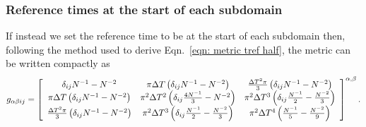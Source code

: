 \documentclass[../full_thesis/full_thesis.tex]{subfiles}
\begin{document}
\subsubsection{Reference times at the start of each subdomain}
If instead we set the reference time to be at the start of each subdomain then,
following the method used to derive Eqn.~\eqref{eqn: metric tref half}, the
metric can be written compactly as
\begin{equation}
g_{\alpha\beta ij}  =  \left[\begin{array}{ccc}
\delta_{ij}N^{-1}  -N^{-2}  &
\pi\Delta T \left( \delta_{ij}N^{-1} - N^{-2}\right)&
\frac{\Delta T^{2}\pi}{3} \left( \delta_{ij}N^{-1} - N^{-2}\right)\\
\pi\Delta T \left( \delta_{ij}N^{-1} - N^{-2}\right)&
\pi^{2}\Delta T^{2}\left(\delta_{ij}\frac{4N^{-1}}{3} - N^{-2}\right) &
\pi^{2}\Delta T^{3}\left(\delta_{ij}\frac{N^{-1}}{2} - \frac{N^{-2}}{3}\right) \\
\frac{\Delta T^{2}\pi}{3} \left( \delta_{ij}N^{-1} - N^{-2}\right) &
\pi^{2}\Delta T^{3}\left(\delta_{ij}\frac{N^{-1}}{2} - \frac{N^{-2}}{3}\right)  &
\pi^{2}\Delta T^{4}\left(\frac{N^{-1}}{5} - \frac{N^{-2}}{9}\right) \\
\end{array}
\right]^{\alpha, \beta}.
\label{eqn: metric equal subdomains tref 0}
\end{equation}



\biblio
\end{document}
